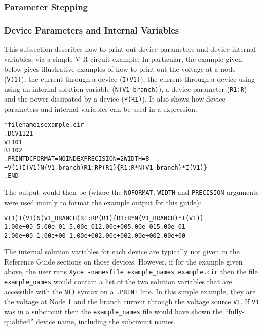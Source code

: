 \subsubsection{Parameter Stepping}
\label{Print_Step}


\subsubsection{Device Parameters and Internal Variables}
\label{Print_Device_Info}
This subsection describes how to print out device parameters and device 
internal variables, via a simple V-R circuit example. In particular, 
the example given below gives illustrative examples of how to print out the voltage
at a node ({\tt V(1)}), the current through a device ({\tt I(V1)}), the current through
a device using using an internal solution variable ({\tt N(V1\_branch)}), a device 
parameter ({\tt R1:R}) and the power dissipated by a device ({\tt P(R1)}).  It also shows
how device parameters and internal variables can be used in a \Xyce{} expression.
\begin{alltt}
* filename is example.cir
.DC V1 1 2 1
V1 1 0 1
R1 1 0 2
.PRINT DC FORMAT=NOINDEX PRECISION=2 WIDTH=8 
+ V(1) I(V1) N(V1_branch) R1:R P(R1) \{R1:R*N(V1_branch)*I(V1)\}
.END
\end{alltt}
The \Xyce{} output would then be (where the {\tt NOFORMAT}, {\tt WIDTH} and {\tt PRECISION}
arguments were used mainly to format the example output for this guide):
\begin{alltt}
   V(1)        I(V1)    N(V1\_BRANCH)    R1:R        P(R1)    \{R1:R*N(V1\_BRANCH)*I(V1)\}
   1.00e+00   -5.00e-01   -5.00e-01    2.00e+00    5.00e-01    5.00e-01
   2.00e+00   -1.00e+00   -1.00e+00    2.00e+00    2.00e+00    2.00e+00
\end{alltt}
The internal solution variables for each \Xyce{} device are typically not given in the Reference 
Guide sections on those devices.  However, if for the example given above, the user runs \texttt{Xyce 
-namesfile example\_names example.cir} then the file \texttt{example\_names} would contain a list
of the two solution variables that are accessible with the {\tt N()} syntax on a {\tt .PRINT} line.
In this simple example, they are the voltage at Node 1 and the branch current through the voltage
source {\tt V1}.  If {\tt V1} was in a subcircuit then the \texttt{example\_names} file would have shown
the ``fully-qualified'' device name, including the subcircuit names.
